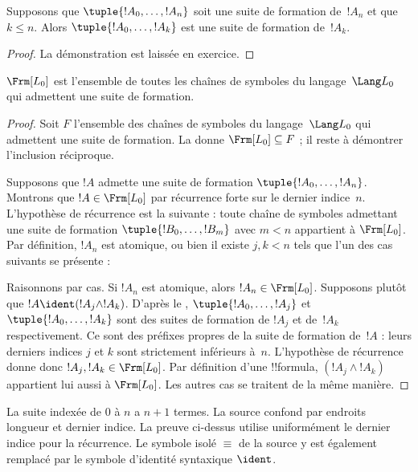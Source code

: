 \documentclass[11pt,a4paper,openany]{memoir}
\begin{document}
\begin{lem}
Supposons que $\tuple{!A_0,\dotsc,!A_n}$ soit une suite de formation
de~$!A_n$ et que $k \leq n$. Alors $\tuple{!A_0,\dotsc,!A_k}$ est
une suite de formation de~$!A_k$.
\end{lem}

\begin{proof}
La démonstration est laissée en exercice.
\end{proof}

\begin{thm}
$\Frm[L_0]$ est l'ensemble de toutes les chaînes de symboles du
langage~$\Lang L_0$ qui admettent une suite de formation.
\end{thm}

\begin{proof}
Soit $F$ l'ensemble des chaînes de symboles du langage~$\Lang L_0$
qui admettent une suite de formation. La
 donne $\Frm[L_0] \subseteq F$ ;
il reste à démontrer l'inclusion réciproque.

Supposons que $!A$ admette une suite de formation
$\tuple{!A_0,\dotsc,!A_n}$. Montrons que $!A \in \Frm[L_0]$ par
récurrence forte sur le dernier indice~$n$. L'hypothèse de récurrence
est la suivante : toute chaîne de symboles admettant une suite de
formation $\tuple{!B_0,\dotsc,!B_m}$ avec $m < n$ appartient à
$\Frm[L_0]$. Par définition, $!A_n$ est atomique, ou bien il existe
$j,k < n$ tels que l'un des cas suivants se présente :
\begin{enumerate}
\end{enumerate}
Raisonnons par cas. Si $!A_n$ est atomique, alors
$!A_n \in \Frm[L_0]$. Supposons plutôt que
$!A \ident (!A_j \land !A_k)$. D'après le
,
$\tuple{!A_0,\dotsc,!A_j}$ et $\tuple{!A_0,\dotsc,!A_k}$
sont des suites de formation de $!A_j$ et de~$!A_k$ respectivement.
Ce sont des préfixes propres de la suite de formation de~$!A$ :
leurs derniers indices $j$ et $k$ sont strictement inférieurs
à~$n$. L'hypothèse de récurrence donne donc
$!A_j,!A_k \in \Frm[L_0]$. Par définition d'une !!{formula},
$(!A_j \land !A_k)$ appartient lui aussi à $\Frm[L_0]$.
Les autres cas se traitent de la même manière.
\end{proof}
\begin{editorial}
La suite indexée de $0$ à $n$ a $n+1$ termes. La source confond
par endroits longueur et dernier indice. La preuve ci-dessus
utilise uniformément le dernier indice pour la récurrence.
Le symbole isolé $\equiv$ de la source y est également remplacé
par le symbole d'identité syntaxique $\ident$.
\end{editorial}
\end{document}
